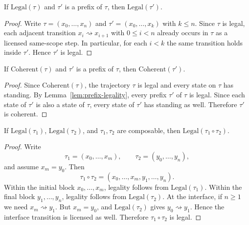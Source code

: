 \begin{lemma}
\label{lem:prefix-legality}
If $\mathrm{Legal}(\tau)$ and $\tau'$ is a prefix of $\tau$, then $\mathrm{Legal}(\tau')$.
\end{lemma}

\begin{proof}
Write $\tau=(x_0,\dots,x_n)$ and $\tau'=(x_0,\dots,x_k)$ with $k\le n$. Since $\tau$ is legal, each adjacent transition $x_i\rightsquigarrow x_{i+1}$ with $0\le i<n$ already occurs in $\tau$ as a licensed same-scope step. In particular, for each $i<k$ the same transition holds inside $\tau'$. Hence $\tau'$ is legal.\cite{MaleyTrajectory}
\end{proof}

\begin{theorem}
\label{thm:prefix-preservation}
If $\mathrm{Coherent}(\tau)$ and $\tau'$ is a prefix of $\tau$, then $\mathrm{Coherent}(\tau')$.
\end{theorem}

\begin{proof}
Since $\mathrm{Coherent}(\tau)$, the trajectory $\tau$ is legal and every state on $\tau$ has standing. By Lemma~\ref{lem:prefix-legality}, every prefix $\tau'$ of $\tau$ is legal. Since each state of $\tau'$ is also a state of $\tau$, every state of $\tau'$ has standing as well. Therefore $\tau'$ is coherent.\cite{MaleyTrajectory}
\end{proof}

\begin{proposition}
\label{prop:composition-legality}
If $\mathrm{Legal}(\tau_1)$, $\mathrm{Legal}(\tau_2)$, and $\tau_1,\tau_2$ are composable, then $\mathrm{Legal}(\tau_1\circ \tau_2)$.
\end{proposition}

\begin{proof}
Write
\[
\tau_1=(x_0,\dots,x_m), \qquad \tau_2=(y_0,\dots,y_n),
\]
and assume $x_m=y_0$. Then
\[
\tau_1\circ \tau_2=(x_0,\dots,x_m,y_1,\dots,y_n).
\]
Within the initial block $x_0,\dots,x_m$, legality follows from $\mathrm{Legal}(\tau_1)$. Within the final block $y_1,\dots,y_n$, legality follows from $\mathrm{Legal}(\tau_2)$. At the interface, if $n\ge 1$ we need $x_m\rightsquigarrow y_1$. But $x_m=y_0$, and $\mathrm{Legal}(\tau_2)$ gives $y_0\rightsquigarrow y_1$. Hence the interface transition is licensed as well. Therefore $\tau_1\circ \tau_2$ is legal.\cite{MaleyTrajectory}
\end{proof}

